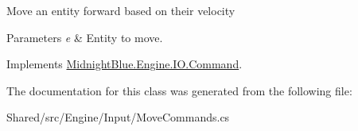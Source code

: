 Move an entity forward based on their velocity 


\begin{DoxyParams}{Parameters}
{\em e} & Entity to move.\\
\hline
\end{DoxyParams}


Implements \hyperlink{class_midnight_blue_1_1_engine_1_1_i_o_1_1_command_ae641d2c1a9db17f03ee6b7854b00a9d2}{Midnight\+Blue.\+Engine.\+I\+O.\+Command}.



The documentation for this class was generated from the following file\+:\begin{DoxyCompactItemize}
\item 
Shared/src/\+Engine/\+Input/Move\+Commands.\+cs\end{DoxyCompactItemize}
